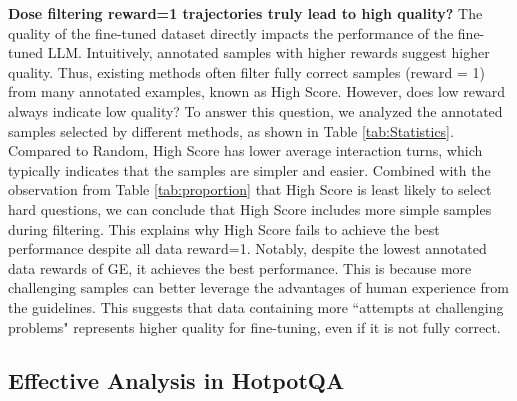 \textbf{Dose filtering reward=1 trajectories truly lead to high quality?} The quality of the fine-tuned dataset directly impacts the performance of the fine-tuned LLM. Intuitively, annotated samples with  higher rewards suggest higher quality. Thus, existing methods often filter fully correct samples (reward = 1) from many annotated examples, known as High Score. However, does low reward always indicate low quality? To answer this question, we analyzed the annotated samples selected by different  methods, as shown in Table \ref{tab:Statistics}. Compared to Random, High Score has lower average interaction turns, which typically indicates that the samples are simpler and easier. Combined with the observation from Table \ref{tab:proportion} that High Score is least likely to select hard questions, we can conclude that High Score includes more simple samples during filtering. This explains why High Score fails to achieve the best performance despite all data reward=1. Notably, despite the lowest annotated data rewards of GE, it achieves the best performance. This is because more challenging samples can better leverage the advantages of human experience from the guidelines. This suggests that data containing more ``attempts at challenging problems"  represents higher quality for fine-tuning, even if it is not fully correct.


\subsection{Effective Analysis in HotpotQA}


